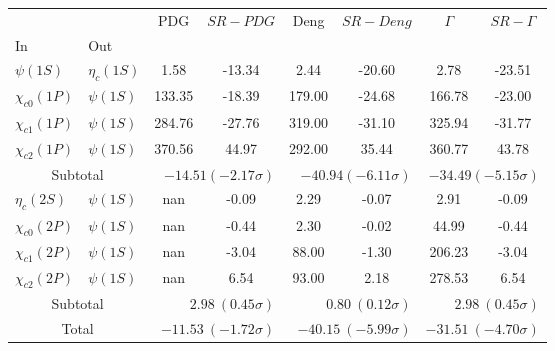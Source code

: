 \begin{tabular}{|l|l|c|c|c|c|c|c|}%
\hline%
&&PDG&$SR-PDG$&Deng&$SR-Deng$&$\Gamma$&$SR-\Gamma$\\%
In&Out&&&&&&\\%
\hline%
$\psi(1S)$&$\eta_{c}(1S)$&1.58&-13.34&2.44&-20.60&2.78&-23.51\\%
$\chi_{c0}(1P)$&$\psi(1S)$&133.35&-18.39&179.00&-24.68&166.78&-23.00\\%
$\chi_{c1}(1P)$&$\psi(1S)$&284.76&-27.76&319.00&-31.10&325.94&-31.77\\%
$\chi_{c2}(1P)$&$\psi(1S)$&370.56&44.97&292.00&35.44&360.77&43.78\\%
\hline%
\hline%
\multicolumn{2}{|c|}{Subtotal}&\multicolumn{2}{|r|}{$-14.51 (-2.17\sigma)$}&\multicolumn{2}{|r|}{$-40.94 (-6.11\sigma)$}&\multicolumn{2}{|r|}{$-34.49 (-5.15\sigma)$}\\%
\hline%
\hline%
$\eta_{c}(2S)$&$\psi(1S)$&nan&-0.09&2.29&-0.07&2.91&-0.09\\%
$\chi_{c0}(2P)$&$\psi(1S)$&nan&-0.44&2.30&-0.02&44.99&-0.44\\%
$\chi_{c1}(2P)$&$\psi(1S)$&nan&-3.04&88.00&-1.30&206.23&-3.04\\%
$\chi_{c2}(2P)$&$\psi(1S)$&nan&6.54&93.00&2.18&278.53&6.54\\%
\hline%
\hline%
\multicolumn{2}{|c|}{Subtotal}&\multicolumn{2}{|r|}{$2.98~(0.45\sigma)$}&\multicolumn{2}{|r|}{$0.80~(0.12\sigma)$}&\multicolumn{2}{|r|}{$2.98~(0.45\sigma)$}\\%
\hline%
\hline%
\multicolumn{2}{|c|}{Total}&\multicolumn{2}{|r|}{$-11.53~(-1.72\sigma)$}&\multicolumn{2}{|r|}{$-40.15~(-5.99\sigma)$}&\multicolumn{2}{|r|}{$-31.51~(-4.70\sigma)$}\\%
\hline%
\end{tabular}